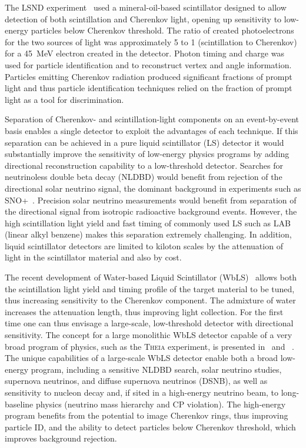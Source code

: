 The LSND experiment~\cite{lsnd} used a mineral-oil-based scintillator designed to allow detection of both scintillation and Cherenkov light, opening up  sensitivity to low-energy particles  below  Cherenkov threshold. The ratio of created photoelectrons for the two sources of light was approximately 5 to 1 (scintillation to Cherenkov) for a 45~MeV electron created in the detector. Photon timing and charge was used for particle identification and to reconstruct vertex and angle information. Particles emitting Cherenkov radiation produced significant fractions of prompt light and thus particle identification techniques relied on the fraction of prompt light as a tool for discrimination.

Separation of Cherenkov- and scintillation-light components on an event-by-event basis enables a single detector to exploit the advantages of each technique.  If this separation can be achieved in a pure liquid scintillator (LS) detector it would substantially improve the sensitivity of low-energy physics programs by adding directional reconstruction capability to a low-threshold detector. Searches for neutrinoless double beta decay (NLDBD) would benefit from rejection of the directional solar neutrino signal, the dominant background in experiments such as SNO+~\cite{snop}.  Precision solar neutrino measurements would benefit from  separation of the directional signal from isotropic radioactive background events. 
However, the high scintillation light yield and fast timing of commonly used LS such as LAB (linear alkyl benzene) makes this separation extremely challenging.  In addition, liquid scintillator detectors are limited to kiloton scales by the attenuation of light in the scintillator material and also by cost.

The recent development of Water-based Liquid Scintillator (WbLS)~\cite{wbls} allows both the scintillation light yield and timing profile of the target material to be tuned, thus increasing sensitivity to the Cherenkov component.  The admixture of water increases the attenuation length, thus improving light collection.  For the first time one can thus envisage a large-scale, low-threshold detector with directional sensitivity.  
The concept for a large monolithic WbLS detector capable of a very broad program of physics, such as the \textsc{Theia} experiment, is presented in~\cite{asdc} and ~\cite{theia}.  The unique capabilities of a large-scale WbLS detector enable both a broad low-energy program, including a sensitive NLDBD search, solar neutrino studies, supernova neutrinos, and diffuse supernova neutrinos (DSNB), as well as sensitivity to nucleon decay and, if sited in a high-energy neutrino beam, to long-baseline physics (neutrino mass hierarchy and CP violation).  The high-energy program benefits from the potential to image Cherenkov rings, thus improving particle ID, and the ability to detect particles below Cherenkov threshold, which improves background rejection.

